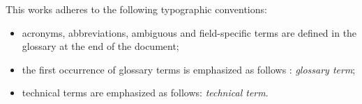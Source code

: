 This works adheres to the following typographic conventions:
\begin{itemize}
	\item acronyms, abbreviations, ambiguous and field-specific terms are defined in the glossary at the end of the document;
	\item the first occurrence of glossary terms is emphasized as follows : \emph{glossary term}\glsfirstoccur;
	\item technical terms are emphasized as follows: \emph{technical term}.
\end{itemize}